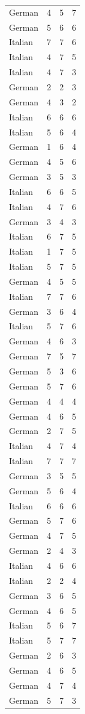 \begin{table}[htbp]
\begin{tabular}{lccc}
German & 4 & 5 & 7 \\
German & 5 & 6 & 6 \\
Italian & 7 & 7 & 6 \\
Italian & 4 & 7 & 5 \\
Italian & 4 & 7 & 3 \\
German & 2 & 2 & 3 \\
German & 4 & 3 & 2 \\
Italian & 6 & 6 & 6 \\
Italian & 5 & 6 & 4 \\
German & 1 & 6 & 4 \\
German & 4 & 5 & 6 \\
German & 3 & 5 & 3 \\
Italian & 6 & 6 & 5 \\
Italian & 4 & 7 & 6 \\
German & 3 & 4 & 3 \\
Italian & 6 & 7 & 5 \\
Italian & 1 & 7 & 5 \\
Italian & 5 & 7 & 5 \\
German & 4 & 5 & 5 \\
Italian & 7 & 7 & 6 \\
German & 3 & 6 & 4 \\
Italian & 5 & 7 & 6 \\
German & 4 & 6 & 3 \\
German & 7 & 5 & 7 \\
German & 5 & 3 & 6 \\
German & 5 & 7 & 6 \\
German & 4 & 4 & 4 \\
German & 4 & 6 & 5 \\
German & 2 & 7 & 5 \\
Italian & 4 & 7 & 4 \\
Italian & 7 & 7 & 7 \\
German & 3 & 5 & 5 \\
German & 5 & 6 & 4 \\
Italian & 6 & 6 & 6 \\
German & 5 & 7 & 6 \\
German & 4 & 7 & 5 \\
German & 2 & 4 & 3 \\
Italian & 4 & 6 & 6 \\
Italian & 2 & 2 & 4 \\
German & 3 & 6 & 5 \\
German & 4 & 6 & 5 \\
Italian & 5 & 6 & 7 \\
Italian & 5 & 7 & 7 \\
German & 2 & 6 & 3 \\
German & 4 & 6 & 5 \\
German & 4 & 7 & 4 \\
German & 5 & 7 & 3 \\
\bottomrule
\end{tabular}
\end{table}
